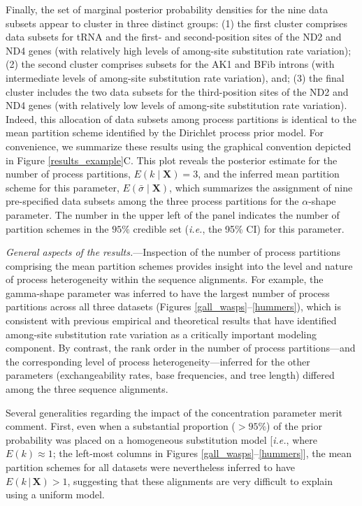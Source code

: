 \documentclass[11pt]{article}
\newcommand{\given}{\ensuremath{\,|\,}}
\begin{document}
Finally, the set of marginal posterior probability densities for the nine data subsets appear to cluster in three distinct groups: 
(1) the first cluster comprises data subsets for tRNA and the first- and second-position sites of the ND2 and ND4 genes (with relatively high levels of among-site substitution rate variation);
(2) the second cluster comprises subsets for the AK1 and BFib introns (with intermediate levels of among-site substitution rate variation), and;
(3)  the final cluster includes the two data subsets for the third-position sites of the ND2 and ND4 genes (with relatively low levels of among-site substitution rate variation).  
Indeed, this allocation of data subsets among process partitions is identical to the mean partition scheme identified by the Dirichlet process prior model.  
For convenience, we summarize these results using the graphical convention depicted in Figure \ref{results_example}C.  
This plot reveals the posterior estimate for the number of process partitions, $E(k \mid \mathbf{X}) = 3$, and the inferred mean partition scheme for this parameter, $E(\bar{\sigma} \mid \mathbf{X})$, which summarizes the assignment of nine pre-specified data subsets among the three process partitions for 
the $\alpha$-shape parameter.  
The number in the upper left of the panel indicates the number of partition schemes in the $95\%$ credible set ({\it i.e.}, the 95\% CI) for this parameter.

\bigskip
\noindent
{\it General aspects of the results.}---Inspection of the number of process partitions comprising the mean partition schemes provides insight into the level and nature of process heterogeneity within the sequence alignments.  
For example, the gamma-shape parameter was inferred to have the largest number of process partitions across all three datasets (Figures \ref{gall_wasps}--\ref{hummers}), which is consistent with previous empirical \citep[{\it e.g.},][]{nylander04} and theoretical \citep[{\it e.g.},][]{yang96a,huelsenbeck04b} results that have identified among-site substitution rate variation as a critically important modeling component.  
By contrast, the rank order in the number of process partitions---and the corresponding level of process heterogeneity---inferred for the other parameters (exchangeability rates, base frequencies, and tree length) differed among the three sequence alignments. 

Several generalities regarding the impact of the concentration parameter merit comment.  
First, even when a substantial proportion ($>95\%$) of the prior probability was placed on a homogeneous substitution model [{\it i.e.}, where $E(k) \approx 1$; the left-most columns in Figures \ref{gall_wasps}--\ref{hummers}], the mean partition schemes for all datasets were nevertheless inferred to have $E(k \given \mathbf{X}) > 1$, suggesting that these alignments are very difficult to explain using a uniform model.
\end{document}
